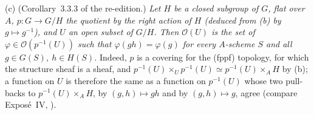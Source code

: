 \label{cor:sga3-VIA-3.3.3}%
(c) (Corollary~3.3.3 of the re-edition.) \emph{Let \(H\) be a closed subgroup of \(G\), flat over
\(A\), \(p\colon G\to G/H\) the quotient by the right action of \(H\) \textup{(}deduced from (b) by
\(g\mapsto g^{-1}\)\textup{)}, and \(U\) an open subset of \(G/H\). Then \(\mathcal O(U)\) is the set
of \(\varphi\in\mathcal O(p^{-1}(U))\) such that \(\varphi(gh)=\varphi(g)\) for every \(A\)-scheme \(S\)
and all \(g\in G(S)\), \(h\in H(S)\).} Indeed, \(p\) is a covering for the (fppf) topology, for which
the structure sheaf is a sheaf, and \(p^{-1}(U)\times_U p^{-1}(U)\simeq p^{-1}(U)\times_AH\) by (b); a
function on \(U\) is therefore the same as a function on \(p^{-1}(U)\) whose two pull-backs to
\(p^{-1}(U)\times_AH\), by \((g,h)\mapsto gh\) and by \((g,h)\mapsto g\), agree (compare
Exposé~IV, ).
